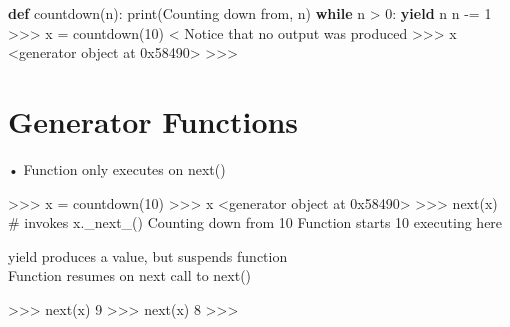 \documentclass[
  letterpaper,
  DIV=11,
  numbers=noendperiod]{scrreprt}
\newenvironment{Shaded}{\begin{snugshade}}{\end{snugshade}}
\newcommand{\BaseNTok}[1]{\textcolor[rgb]{0.68,0.00,0.00}{#1}}
\newcommand{\BuiltInTok}[1]{\textcolor[rgb]{0.00,0.23,0.31}{#1}}
\newcommand{\ControlFlowTok}[1]{\textcolor[rgb]{0.00,0.23,0.31}{\textbf{#1}}}
\newcommand{\DecValTok}[1]{\textcolor[rgb]{0.68,0.00,0.00}{#1}}
\newcommand{\KeywordTok}[1]{\textcolor[rgb]{0.00,0.23,0.31}{\textbf{#1}}}
\newcommand{\NormalTok}[1]{\textcolor[rgb]{0.00,0.23,0.31}{#1}}
\newcommand{\OperatorTok}[1]{\textcolor[rgb]{0.37,0.37,0.37}{#1}}
\newcommand{\StringTok}[1]{\textcolor[rgb]{0.13,0.47,0.30}{#1}}
\begin{document}
\begin{Shaded}
\begin{Highlighting}[]
\KeywordTok{def}\NormalTok{ countdown(n):}
    \BuiltInTok{print}\NormalTok{(}\StringTok{\textquotesingle{}Counting down from\textquotesingle{}}\NormalTok{, n)}
    \ControlFlowTok{while}\NormalTok{ n }\OperatorTok{\textgreater{}} \DecValTok{0}\NormalTok{:}
        \ControlFlowTok{yield}\NormalTok{ n}
\NormalTok{        n }\OperatorTok{{-}=} \DecValTok{1}
\OperatorTok{\textgreater{}\textgreater{}\textgreater{}}\NormalTok{ x }\OperatorTok{=}\NormalTok{ countdown(}\DecValTok{10}\NormalTok{) }\OperatorTok{\textless{}}\NormalTok{ Notice that no output was produced}
\OperatorTok{\textgreater{}\textgreater{}\textgreater{}}\NormalTok{ x}
\OperatorTok{\textless{}}\NormalTok{generator }\BuiltInTok{object}\NormalTok{ at }\BaseNTok{0x58490}\OperatorTok{\textgreater{}}
\OperatorTok{\textgreater{}\textgreater{}\textgreater{}} 
\end{Highlighting}
\end{Shaded}


\chapter{Generator Functions}\label{generator-functions-2}

• Function only executes on next()

\begin{Shaded}
\begin{Highlighting}[]
\NormalTok{\textgreater{}\textgreater{}\textgreater{} x = countdown(10)  }
\NormalTok{\textgreater{}\textgreater{}\textgreater{} x  }
\NormalTok{\textless{}generator object at 0x58490\textgreater{}  }
\NormalTok{\textgreater{}\textgreater{}\textgreater{} next(x) \# invokes x.\_next\_()  }
\NormalTok{Counting down from 10  }
\NormalTok{Function starts  }
\NormalTok{10 executing here }
\end{Highlighting}
\end{Shaded}

yield produces a value, but suspends function\\
Function resumes on next call to next()

\begin{Shaded}
\begin{Highlighting}[]
\NormalTok{\textgreater{}\textgreater{}\textgreater{} next(x)   }
\NormalTok{9   }
\NormalTok{\textgreater{}\textgreater{}\textgreater{} next(x)   }
\NormalTok{8   }
\NormalTok{\textgreater{}\textgreater{}\textgreater{} }
\end{Highlighting}
\end{Shaded}
\end{document}
